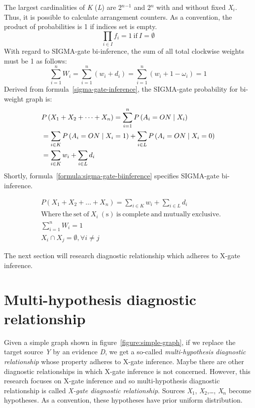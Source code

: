 \documentclass{article}
\numberwithin{equation}{section}
\numberwithin{figure}{section}
\numberwithin{table}{section}
\begin{document}
The largest cardinalities of \textit{K} (\textit{L}) are 2\textit{${}^{n}$}${}^{-1}$ and 2\textit{${}^{n}$} with and without fixed \textit{X${}_{i}$}. Thus, it is possible to calculate arrangement counters. As a convention, the product of probabilities is 1 if indices set is empty.
\[\prod_{i\in I}{f_i}=1\ \mathrm{if}\ I=\emptyset \] 
With regard to SIGMA-gate bi-inference, the sum of all total clockwise weights must be 1 as follows:
\[\sum^n_{i=1}{W_i}=\sum^n_{i=1}{\left(w_i+d_i\right)}=\sum^n_{i=1}{\left(w_i+1-{\omega }_i\right)}=1\] 
Derived from formula~\ref{sigma-gate-inference}, the SIGMA-gate probability for bi-weight graph is:
\begin{align*}
&P\left(X_1+X_2+\dots +X_n\right)=\sum^n_{i=1}{P\left(A_i=ON\mathrel{\left|\vphantom{A_i=ON X_i}\right.\kern-\nulldelimiterspace}X_i\right)}\\
&=\sum_{i\in K}{P\left(A_i=ON\mathrel{\left|\vphantom{A_i=ON X_i=1}\right.\kern-\nulldelimiterspace}X_i=1\right)}+\sum_{i\in L}{P\left(A_i=ON\mathrel{\left|\vphantom{A_i=ON X_i=0}\right.\kern-\nulldelimiterspace}X_i=0\right)}\\
&=\sum_{i\in K}{w_i}+\sum_{i\in L}{d_i}
\end{align*}
Shortly, formula~\ref{formula:sigma-gate-biinference} specifies SIGMA-gate bi-inference.

\begin{equation}
\begin{split}
&P\left(X_1+X_2+\dots +X_n\right)=\sum_{i\in K}{w_i}+\sum_{i\in L}{d_i}\\
&\mathrm{Where}\ \mathrm{the}\ \mathrm{set}\ \mathrm{of}\ X_i\ \mathrm{(s)}\ \mathrm{is}\ \mathrm{complete}\ \mathrm{and}\ \mathrm{mutually}\ \mathrm{exclusive.}\\
&\sum^n_{i=1}{W_i}=1\\
&X_i\cap X_j=\emptyset ,\forall i\neq j
\end{split}
\label{formula:sigma-gate-biinference}
\end{equation}

The next section will research diagnostic relationship which adheres to X-gate inference.

\section{Multi-hypothesis diagnostic relationship}
Given a simple graph shown in figure~\ref{figure:simple-graph}, if we replace the target source \textit{Y} by an evidence \textit{D}, we get a so-called \textit{multi-hypothesis diagnostic relationship} whose property adheres to X-gate inference. Maybe there are other diagnostic relationships in which X-gate inference is not concerned. However, this research focuses on X-gate inference and so multi-hypothesis diagnostic relationship is called \textit{X-gate diagnostic relationship}. Sources \textit{X}${}_{1}$, \textit{X}${}_{2}$,{\dots}, \textit{X${}_{n}$} become hypotheses\textit{.} As a convention, these hypotheses have prior uniform distribution.
\end{document}
